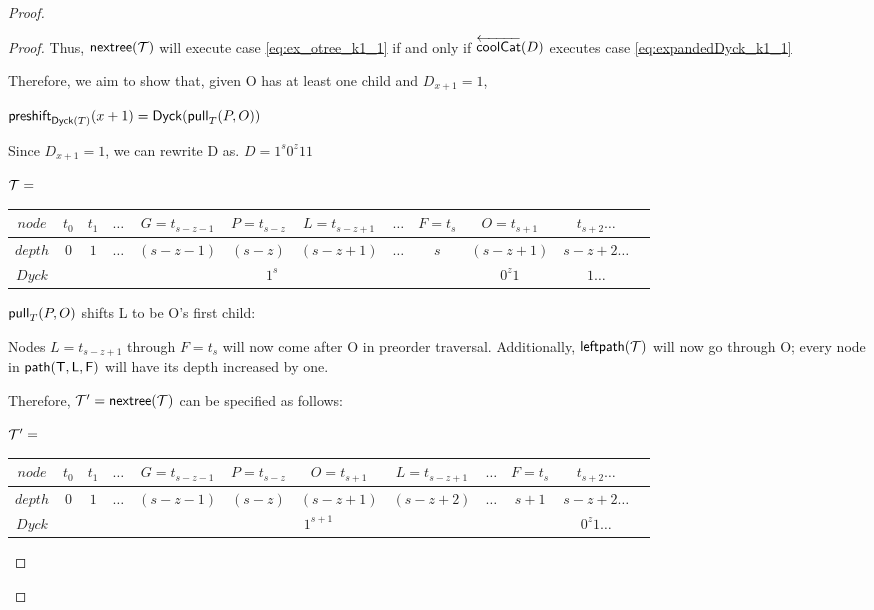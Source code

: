 \begin{proof}
\begin{proof}
    Thus, $\nextTree{T}$ will execute case \ref{eq:ex_otree_k1_1} if and only if $\coolCat{D}$ executes case \ref{eq:expandedDyck_k1_1}

    Therefore, we aim to show that, given O has at least one child and $D_{x+1}=1$,

    $\preshift{\dyck{T}}{x+1}=\dyck{\poppush[T]{P}{O}}$

    Since $D_{x+1}=1$, we can rewrite D as.
    $D=1^s0^z11$


    \noindent $\tree{T}=$
    \begin{center}
	\begin{tabular}{ |c|c|c|c|c|c|c|c|c|c|c|c| } 
	    \hline

	    $node$ & $t_0$ & $t_1$ & $\dots$ & $G=t_{s-z-1}$ & $P=t_{s-z}$ & $L=t_{s-z+1}$ & $\dots$ & $F=t_s$ & $O=t_{s+1}$ & $t_{s+2}\dots$ \\
	    \hline
	    $depth$ & $0$ & $1$ & $\dots$ & $(s-z-1)$ & $(s-z)$ & $(s-z+1)$ & $\dots$ & $s$  & $(s-z+1)$ & $s-z+2 \dots$\\
	    \hline
	    $Dyck$ &  &  \multicolumn{7}{|c|}{$1^s$} &  $0^{z}1$   & $1\dots$\\
	    \hline
	\end{tabular}
    \end{center}

    $\poppush[T]{P}{O}$
    shifts L to be O's first child:

    Nodes $L=t_{s-z+1}$ through $F=t_s$ will now come after O in preorder traversal.  Additionally, $\leftdown{T}$ will now go through O; every node in $\path{T}{L}{F}$ will have its depth increased by one.  

    Therefore, $\tree{T}'=\nextTree{T}$ can be specified as follows: 

    \noindent $\tree{T}'=$
    \begin{center}
	\begin{tabular}{ |c|c|c|c|c|c|c|c|c|c|c|c| } 
	    \hline

	    $node$ & $t_0$ & $t_1$ & $\dots$ & $G=t_{s-z-1}$ & $P=t_{s-z}$ & $O=t_{s+1}$ & $L=t_{s-z+1}$ & $\dots$ & $F=t_s$  & $t_{s+2}\dots$ \\
	    \hline
	    $depth$ & $0$ & $1$ & $\dots$ & $(s-z-1)$ & $(s-z)$ & $(s-z+1)$ & $(s-z+2)$ & $\dots$ & $s+1$  & $s-z+2 \dots$\\
	    \hline
	    $Dyck$ &  &  \multicolumn{8}{|c|}{$1^{s+1}$}  & $0^{z}1\dots$\\
	    \hline
	\end{tabular}
    \end{center}


\end{proof}
\end{proof}
